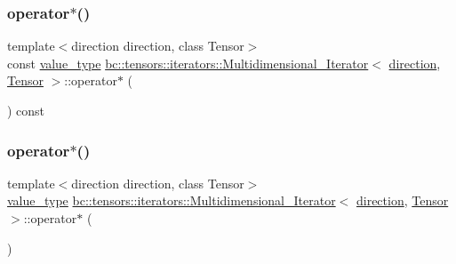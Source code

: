 \mbox{\label{structbc_1_1tensors_1_1iterators_1_1Multidimensional__Iterator_ac3474f8fdc111d4614d96eef217ab98a}} 
\subsubsection{\texorpdfstring{operator$\ast$()}{operator*()}\hspace{0.1cm}{\footnotesize\ttfamily [1/2]}}
{\footnotesize\ttfamily template$<$direction direction, class Tensor$>$ \\
const \hyperlink{structbc_1_1tensors_1_1iterators_1_1Multidimensional__Iterator_a7d62a3cfbac2dd345ffcbc854aae0e42}{value\+\_\+type} \hyperlink{structbc_1_1tensors_1_1iterators_1_1Multidimensional__Iterator}{bc\+::tensors\+::iterators\+::\+Multidimensional\+\_\+\+Iterator}$<$ \hyperlink{namespacebc_1_1tensors_1_1iterators_ae76efe63fb9cb4985d5e4e6af0ebf296}{direction}, \hyperlink{namespacebc_a659391e47ab612be3ba6c18cf9c89159}{Tensor} $>$\+::operator$\ast$ (\begin{DoxyParamCaption}{ }\end{DoxyParamCaption}) const\hspace{0.3cm}{\ttfamily [inline]}}

\mbox{\label{structbc_1_1tensors_1_1iterators_1_1Multidimensional__Iterator_ac89859344d474e76d5f2586492efdbad}} 
\subsubsection{\texorpdfstring{operator$\ast$()}{operator*()}\hspace{0.1cm}{\footnotesize\ttfamily [2/2]}}
{\footnotesize\ttfamily template$<$direction direction, class Tensor$>$ \\
\hyperlink{structbc_1_1tensors_1_1iterators_1_1Multidimensional__Iterator_a7d62a3cfbac2dd345ffcbc854aae0e42}{value\+\_\+type} \hyperlink{structbc_1_1tensors_1_1iterators_1_1Multidimensional__Iterator}{bc\+::tensors\+::iterators\+::\+Multidimensional\+\_\+\+Iterator}$<$ \hyperlink{namespacebc_1_1tensors_1_1iterators_ae76efe63fb9cb4985d5e4e6af0ebf296}{direction}, \hyperlink{namespacebc_a659391e47ab612be3ba6c18cf9c89159}{Tensor} $>$\+::operator$\ast$ (\begin{DoxyParamCaption}{ }\end{DoxyParamCaption})\hspace{0.3cm}{\ttfamily [inline]}}

